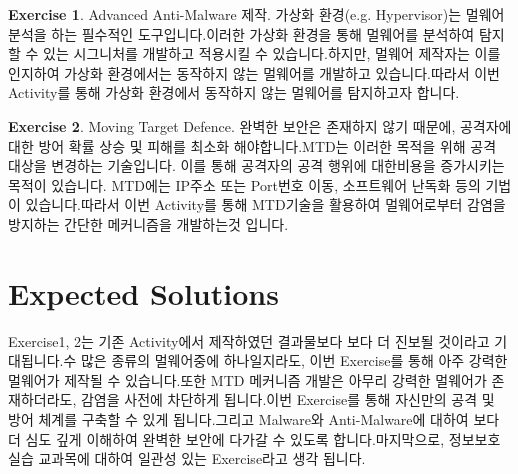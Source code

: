 \documentclass[a4paper, 11pt]{article}
\theoremstyle{definition}
\newtheorem{exercise}{Exercise}
\begin{document}
\begin{exercise}

  Advanced Anti-Malware 제작.
  가상화 환경(e.g. Hypervisor)는 멀웨어 분석을 하는 필수적인 도구입니다.이러한 가상화 환경을 통해 멀웨어를 분석하여 탐지할 수 있는 시그니처를 개발하고 적용시킬 수 있습니다.하지만, 멀웨어 제작자는 이를 인지하여 가상화 환경에서는 동작하지 않는 멀웨어를 개발하고 있습니다.따라서 이번 Activity를 통해 가상화 환경에서 동작하지 않는 멀웨어를 탐지하고자 합니다.

\end{exercise}

\begin{exercise}

  Moving Target Defence.
  완벽한 보안은 존재하지 않기 때문에, 공격자에 대한 방어 확률 상승 및 피해를 최소화 해야합니다.MTD는 이러한 목적을 위해 공격 대상을 변경하는 기술입니다. 이를 통해 공격자의 공격 행위에 대한비용을 증가시키는 목적이 있습니다. MTD에는 IP주소 또는 Port번호 이동, 소프트웨어 난독화 등의 기법이 있습니다.따라서 이번 Activity를 통해 MTD기술을 활용하여 멀웨어로부터 감염을 방지하는 간단한 메커니즘을 개발하는것 입니다.

\end{exercise}

\section{Expected Solutions}

Exercise1, 2는 기존 Activity에서 제작하였던 결과물보다 보다 더 진보될 것이라고 기대됩니다.수 많은 종류의 멀웨어중에 하나일지라도, 이번 Exercise를 통해 아주 강력한 멀웨어가 제작될 수 있습니다.또한 MTD 메커니즘 개발은 아무리 강력한 멀웨어가 존재하더라도, 감염을 사전에 차단하게 됩니다.이번 Exercise를 통해 자신만의 공격 및 방어 체계를 구축할 수 있게 됩니다.그리고 Malware와 Anti-Malware에 대하여 보다 더 심도 깊게 이해하여 완벽한 보안에 다가갈 수 있도록 합니다.마지막으로, 정보보호 실습 교과목에 대하여 일관성 있는 Exercise라고 생각 됩니다.




\end{document}
